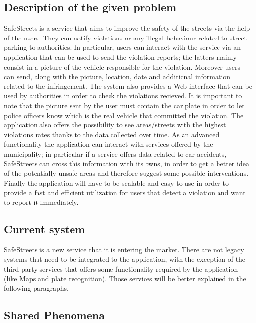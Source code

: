 \subsection{Description of the given problem}
SafeStreets is a service that aims to improve the safety of the streets via the help of the users. They can notify violations or any illegal behaviour related to street parking to authorities. In particular, users can interact with the service via an application that can be used to send the violation reports; the latters mainly consist in a picture of the vehicle responsible for the violation. Moreover users can send, along with the picture, location, date and additional information related to the infringement. The system also provides a Web interface that can be used by authorities in order to check the violations recieved. It is important to note that the picture sent by the user must contain the car plate in order to let police officers know which is the real vehicle that committed the violation. The application also offers the possibility to see areas/streets with the highest violations rates thanks to the data collected over time. As an advanced functionality the application can interact with services offered by the municipality; in particular if a service offers data related to car accidents, SafeStreets can cross this information with its owns, in order to get a better idea of the potentially unsafe areas and therefore suggest some possible interventions. Finally the application will have to be scalable and easy to use in order to provide a fast and efficient utilization for users that detect a violation and want to report it immediately.

\subsection{Current system}
SafeStreets is a new service that it is entering the market. There are not legacy systems that need to be integrated to the application, with the exception of the third party services that offers some functionality required by the application (like Maps and plate recognition). Those services will be better explained in the following paragraphs.


\subsection{Shared Phenomena}


